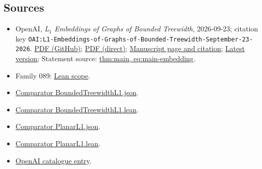 \documentclass[11pt]{article}
\begin{document}
\subsection{Sources}
\begin{itemize}
\item OpenAI, \emph{L\({}_{1}\) Embeddings of Graphs of Bounded Treewidth}, 2026-09-23; citation key \texttt{OAI:L1-Embeddings-of-Graphs-of-Bounded-Treewidth-September-23-2026}. \href{https://github.com/openai/math/blob/adc7f1241b42e322a6451854ab7e4b4c146bf78a/preprints/L1-Embeddings-of-Graphs-of-Bounded-Treewidth-September-23-2026/paper.pdf}{PDF (GitHub)}; \href{https://github.com/openai/math/raw/adc7f1241b42e322a6451854ab7e4b4c146bf78a/preprints/L1-Embeddings-of-Graphs-of-Bounded-Treewidth-September-23-2026/paper.pdf}{PDF (direct)}; \href{https://github.com/openai/math/blob/adc7f1241b42e322a6451854ab7e4b4c146bf78a/preprints/L1-Embeddings-of-Graphs-of-Bounded-Treewidth-September-23-2026/README.md}{Manuscript page and citation}; \href{https://github.com/openai/math/blob/main/preprints/L1-Embeddings-of-Graphs-of-Bounded-Treewidth-September-23-2026/paper.pdf}{Latest version}; Statement source: \href{https://github.com/openai/math/blob/adc7f1241b42e322a6451854ab7e4b4c146bf78a/preprints/L1-Embeddings-of-Graphs-of-Bounded-Treewidth-September-23-2026/build/01-introduction.tex\#L27}{thm:main, eq:main-embedding}.
\item Family 089: \href{https://github.com/openai/math/blob/adc7f1241b42e322a6451854ab7e4b4c146bf78a/lean/docs/089.md}{Lean scope}.
\item \href{https://github.com/openai/math/blob/adc7f1241b42e322a6451854ab7e4b4c146bf78a/lean/ComparatorChallenges/BoundedTreewidthL1.json}{Comparator BoundedTreewidthL1.json}.
\item \href{https://github.com/openai/math/blob/adc7f1241b42e322a6451854ab7e4b4c146bf78a/lean/ComparatorChallenges/BoundedTreewidthL1.lean}{Comparator BoundedTreewidthL1.lean}.
\item \href{https://github.com/openai/math/blob/adc7f1241b42e322a6451854ab7e4b4c146bf78a/lean/ComparatorChallenges/PlanarL1.json}{Comparator PlanarL1.json}.
\item \href{https://github.com/openai/math/blob/adc7f1241b42e322a6451854ab7e4b4c146bf78a/lean/ComparatorChallenges/PlanarL1.lean}{Comparator PlanarL1.lean}.
\item \href{https://github.com/openai/math/blob/adc7f1241b42e322a6451854ab7e4b4c146bf78a/CONTENTS.md}{OpenAI catalogue entry}.
\end{itemize}
\end{document}
